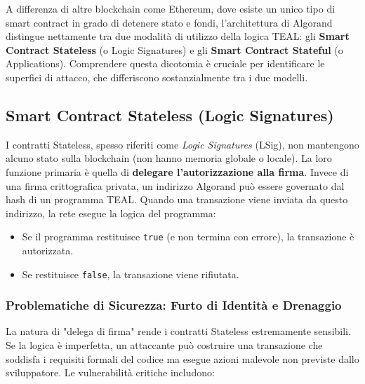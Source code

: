 A differenza di altre blockchain come Ethereum, dove esiste un unico tipo di smart contract in grado di detenere stato e fondi, l'architettura di Algorand distingue nettamente tra due modalità di utilizzo della logica TEAL: gli \textbf{Smart Contract Stateless} (o Logic Signatures) e gli \textbf{Smart Contract Stateful} (o Applications). Comprendere questa dicotomia è cruciale per identificare le superfici di attacco, che differiscono sostanzialmente tra i due modelli.



\subsection{Smart Contract Stateless (Logic Signatures)}
I contratti Stateless, spesso riferiti come \textit{Logic Signatures} (LSig), non mantengono alcuno stato sulla blockchain (non hanno memoria globale o locale). La loro funzione primaria è quella di \textbf{delegare l'autorizzazione alla firma}.
Invece di una firma crittografica privata, un indirizzo Algorand può essere governato dal hash di un programma TEAL. Quando una transazione viene inviata da questo indirizzo, la rete esegue la logica del programma:
\begin{itemize}
    \item Se il programma restituisce \texttt{true} (e non termina con errore), la transazione è autorizzata.
    \item Se restituisce \texttt{false}, la transazione viene rifiutata.
\end{itemize}

\subsubsection{Problematiche di Sicurezza: Furto di Identità e Drenaggio}
La natura di "delega di firma" rende i contratti Stateless estremamente sensibili. Se la logica è imperfetta, un attaccante può costruire una transazione che soddisfa i requisiti formali del codice ma esegue azioni malevole non previste dallo sviluppatore. Le vulnerabilità critiche includono:

